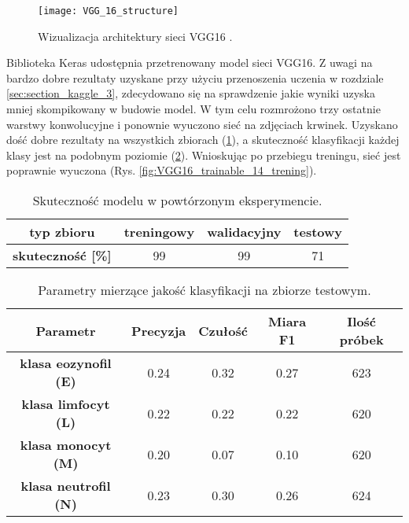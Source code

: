 \begin{figure}[h]
	\centering
	\centering
		\texttt{[image: VGG\_16\_structure]}	
	\caption{Wizualizacja architektury sieci VGG16 \cite{VGG_16_structure}.}
	\label{fig:vgg_16_stucture}
\end{figure}

{\parindent0pt
Biblioteka Keras udostępnia przetrenowany model sieci VGG16. Z uwagi na bardzo dobre rezultaty uzyskane przy użyciu przenoszenia uczenia w rozdziale \ref{sec:section_kaggle_3}, zdecydowano się na sprawdzenie jakie wyniki uzyska mniej skompikowany w budowie model. W tym celu rozmrożono trzy ostatnie warstwy konwolucyjne i ponownie wyuczono sieć na zdjęciach krwinek. Uzyskano dość dobre rezultaty na wszystkich zbiorach (\ref{tab:VGG16_acc}), a skuteczność klasyfikacji każdej klasy jest na podobnym poziomie (\ref{tab:VGG16_params_val}). Wnioskując po przebiegu treningu, sieć jest poprawnie wyuczona (Rys. \ref{fig:VGG16_trainable_14_trening}).

 \begin{table}[h!]
\centering
\caption[Short Heading]{Skuteczność modelu w powtórzonym eksperymencie.}
\label{tab:VGG16_acc}
\begin{tabular}{|c|c|c|c|}
\hline
\textbf{typ zbioru}           & \textbf{treningowy} & \textbf{walidacyjny} & \textbf{testowy} \\ \hline
\textbf{skuteczność {[}\%{]}} & 99                  & 99                   & 71               \\ \hline
\end{tabular}
\end{table}

\begin{table}[h!]
\centering
\caption[Short Heading]{Parametry mierzące jakość klasyfikacji na zbiorze testowym.}
\label{tab:VGG16_params_val}
\begin{tabular}{|c|c|c|c|c|}
\hline
\textbf{Parametr}                               & \textbf{Precyzja} & \textbf{Czułość} & \textbf{Miara F1} & \textbf{Ilość próbek} \\ \hline
\textbf{klasa eozynofil (E)} & 0.24   & 0.32   & 0.27 & 623  \\ \hline
\textbf{klasa limfocyt (L)} & 0.22  & 0.22 & 0.22  & 620  \\ \hline
\textbf{klasa monocyt (M)} & 0.20   & 0.07    & 0.10  & 620  \\ \hline
\textbf{klasa neutrofil (N)} & 0.23   & 0.30    & 0.26  & 624  \\ \hline
\end{tabular}
\end{table}

}
